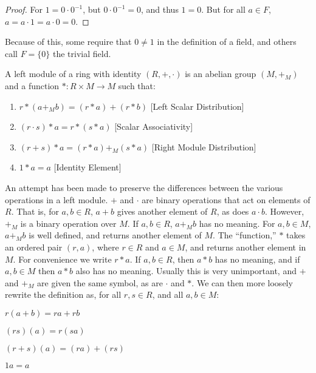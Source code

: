 \documentclass[crop=false,class=book,oneside]{standalone}
\begin{document}
        \begin{proof}
            For $1=0\cdot{0}^{-1}$, but
            $0\cdot{0}^{-1}=0$, and thus $1=0$. But for all
            $a\in{F}$, $a=a\cdot{1}=a\cdot{0}=0$.
        \end{proof}
        Because of this, some require that $0\ne{1}$ in the
        definition of a field, and others call
        $F=\{0\}$ the trivial field.
        \begin{definition}
            A left module of a ring with identity $(R,+,\cdot)$
            is an abelian group $(M,+_{M})$ and a function
            $*:R\times{M}\rightarrow{M}$ such that:
            \begin{enumerate}
                \item $r*(a+_{M}b)=(r*a)+(r*b)$
                      \hfill[Left Scalar Distribution]
                \item $(r\cdot{s})*a=r*(s*a)$
                      \hfill[Scalar Associativity]
                \item $(r+s)*a=(r*a)+_{M}(s*a)$
                      \hfill[Right Module Distribution]
                \item $1*a=a$
                      \hfill[Identity Element]
            \end{enumerate}
        \end{definition}
        An attempt has been made to preserve the differences
        between the various operations in a left module.
        $+$ and $\cdot$ are binary operations that act on
        elements of $R$. That is, for $a,b\in{R}$, $a+b$
        gives another element of $R$, as does $a\cdot{b}$.
        However, $+_{M}$ is a binary operation over
        $M$. If $a,b\in{R}$, $a+_{M}b$ has no meaning.
        For $a,b\in{M}$, $a+_{M}b$ is well defined, and returns
        another element of $M$. The ``function,'' $*$
        takes an ordered pair $(r,a)$, where $r\in{R}$ and
        $a\in{M}$, and returns another element in $M$. For
        convenience we write $r*a$. If $a,b\in{R}$, then
        $a*b$ has no meaning, and if $a,b\in{M}$ then
        $a*b$ also has no meaning. Usually this is very
        unimportant, and $+$ and $+_{M}$ are given the same
        symbol, as are $\cdot$ and $*$. We can then more loosely
        rewrite the definition as, for all $r,s\in{R}$, and
        all $a,b\in{M}$:
        \begin{enumerate}
            \begin{multicols}{2}
                \item $r(a+b)=ra+rb$
                \item $(rs)(a)=r(sa)$
                \item $(r+s)(a)=(ra)+(rs)$
                \item $1a=a$
            \end{multicols}
        \end{enumerate}
\end{document}
